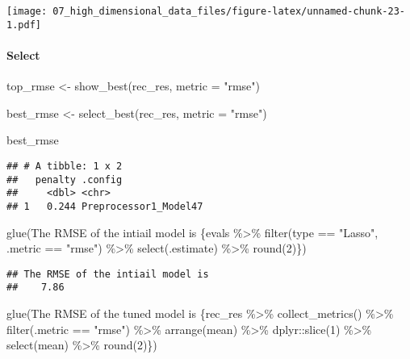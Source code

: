 \documentclass[
]{book}
\newenvironment{Shaded}{\begin{snugshade}}{\end{snugshade}}
\newcommand{\AttributeTok}[1]{\textcolor[rgb]{0.77,0.63,0.00}{#1}}
\newcommand{\FunctionTok}[1]{\textcolor[rgb]{0.00,0.00,0.00}{#1}}
\newcommand{\NormalTok}[1]{#1}
\newcommand{\OtherTok}[1]{\textcolor[rgb]{0.56,0.35,0.01}{#1}}
\newcommand{\StringTok}[1]{\textcolor[rgb]{0.31,0.60,0.02}{#1}}
\begin{document}
\texttt{[image: 07\_high\_dimensional\_data\_files/figure-latex/unnamed-chunk-23-1.pdf]}

\hypertarget{select}{%
\paragraph{Select}\label{select}}

\begin{Shaded}
\begin{Highlighting}[]
\NormalTok{top\_rmse }\OtherTok{\textless{}{-}} \FunctionTok{show\_best}\NormalTok{(rec\_res, }\AttributeTok{metric =} \StringTok{"rmse"}\NormalTok{)}

\NormalTok{best\_rmse }\OtherTok{\textless{}{-}} \FunctionTok{select\_best}\NormalTok{(rec\_res, }\AttributeTok{metric =} \StringTok{"rmse"}\NormalTok{)}

\NormalTok{best\_rmse }
\end{Highlighting}
\end{Shaded}

\begin{verbatim}
## # A tibble: 1 x 2
##   penalty .config              
##     <dbl> <chr>                
## 1   0.244 Preprocessor1_Model47
\end{verbatim}

\begin{Shaded}
\begin{Highlighting}[]
\FunctionTok{glue}\NormalTok{(}\StringTok{\textquotesingle{}The RMSE of the intiail model is }
\StringTok{     \{evals \%\textgreater{}\%}
\StringTok{  filter(type == "Lasso", .metric == "rmse") \%\textgreater{}\%}
\StringTok{  select(.estimate) \%\textgreater{}\%}
\StringTok{  round(2)\}\textquotesingle{}}\NormalTok{)}
\end{Highlighting}
\end{Shaded}

\begin{verbatim}
## The RMSE of the intiail model is 
##    7.86
\end{verbatim}

\begin{Shaded}
\begin{Highlighting}[]
\FunctionTok{glue}\NormalTok{(}\StringTok{\textquotesingle{}The RMSE of the tuned model is \{rec\_res \%\textgreater{}\%}
\StringTok{  collect\_metrics() \%\textgreater{}\%}
\StringTok{  filter(.metric == "rmse") \%\textgreater{}\%}
\StringTok{  arrange(mean) \%\textgreater{}\%}
\StringTok{  dplyr::slice(1) \%\textgreater{}\%}
\StringTok{  select(mean) \%\textgreater{}\%}
\StringTok{  round(2)\}\textquotesingle{}}\NormalTok{)}
\end{Highlighting}
\end{Shaded}
\end{document}
